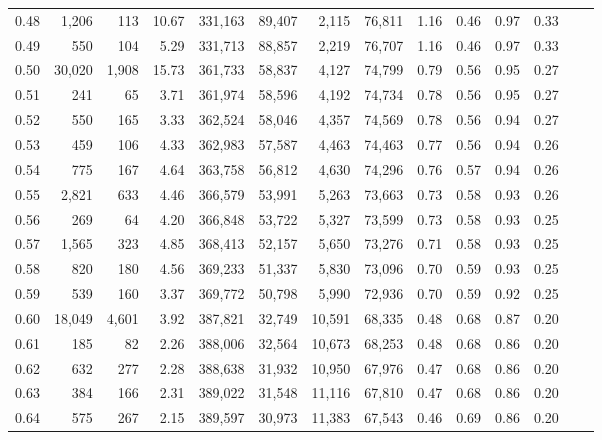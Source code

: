 \begin{tabular}{rrrrrrrrrrrrrr}
0.48 &   1,206 &     113 &     10.67 &  331,163 &   89,407 &   2,115 &  76,811 &  1.16 &  0.46 &  0.97 &      0.33 \\
0.49 &     550 &     104 &      5.29 &  331,713 &   88,857 &   2,219 &  76,707 &  1.16 &  0.46 &  0.97 &      0.33 \\
0.50 &  30,020 &   1,908 &     15.73 &  361,733 &   58,837 &   4,127 &  74,799 &  0.79 &  0.56 &  0.95 &      0.27 \\
0.51 &     241 &      65 &      3.71 &  361,974 &   58,596 &   4,192 &  74,734 &  0.78 &  0.56 &  0.95 &      0.27 \\
0.52 &     550 &     165 &      3.33 &  362,524 &   58,046 &   4,357 &  74,569 &  0.78 &  0.56 &  0.94 &      0.27 \\
0.53 &     459 &     106 &      4.33 &  362,983 &   57,587 &   4,463 &  74,463 &  0.77 &  0.56 &  0.94 &      0.26 \\
0.54 &     775 &     167 &      4.64 &  363,758 &   56,812 &   4,630 &  74,296 &  0.76 &  0.57 &  0.94 &      0.26 \\
0.55 &   2,821 &     633 &      4.46 &  366,579 &   53,991 &   5,263 &  73,663 &  0.73 &  0.58 &  0.93 &      0.26 \\
0.56 &     269 &      64 &      4.20 &  366,848 &   53,722 &   5,327 &  73,599 &  0.73 &  0.58 &  0.93 &      0.25 \\
0.57 &   1,565 &     323 &      4.85 &  368,413 &   52,157 &   5,650 &  73,276 &  0.71 &  0.58 &  0.93 &      0.25 \\
0.58 &     820 &     180 &      4.56 &  369,233 &   51,337 &   5,830 &  73,096 &  0.70 &  0.59 &  0.93 &      0.25 \\
0.59 &     539 &     160 &      3.37 &  369,772 &   50,798 &   5,990 &  72,936 &  0.70 &  0.59 &  0.92 &      0.25 \\
0.60 &  18,049 &   4,601 &      3.92 &  387,821 &   32,749 &  10,591 &  68,335 &  0.48 &  0.68 &  0.87 &      0.20 \\
0.61 &     185 &      82 &      2.26 &  388,006 &   32,564 &  10,673 &  68,253 &  0.48 &  0.68 &  0.86 &      0.20 \\
0.62 &     632 &     277 &      2.28 &  388,638 &   31,932 &  10,950 &  67,976 &  0.47 &  0.68 &  0.86 &      0.20 \\
0.63 &     384 &     166 &      2.31 &  389,022 &   31,548 &  11,116 &  67,810 &  0.47 &  0.68 &  0.86 &      0.20 \\
0.64 &     575 &     267 &      2.15 &  389,597 &   30,973 &  11,383 &  67,543 &  0.46 &  0.69 &  0.86 &      0.20 \\

\end{tabular}
